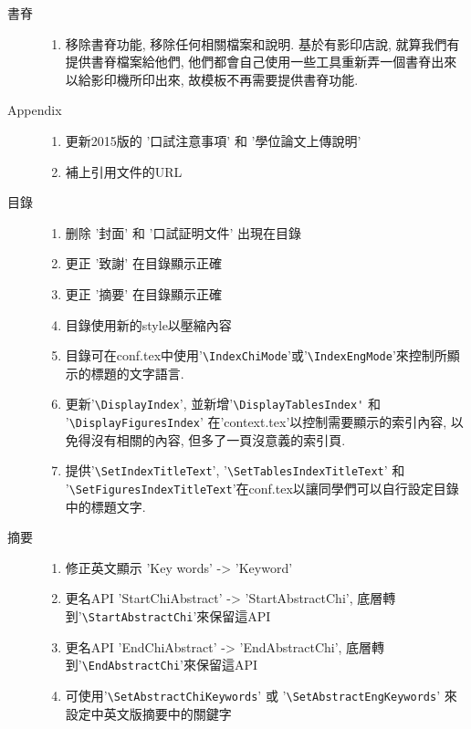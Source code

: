 \begin{description}
\begin{description}
      \item[書脊] \hfill
        \begin{enumerate}
          \item 移除書脊功能, 移除任何相關檔案和說明. 基於有影印店說, 就算我們有提供書脊檔案給他們, 他們都會自己使用一些工具重新弄一個書脊出來以給影印機所印出來, 故模板不再需要提供書脊功能.
        \end{enumerate}
      \item[Appendix] \hfill
        \begin{enumerate}
          \item 更新2015版的 '口試注意事項' 和 '學位論文上傳說明'
          \item 補上引用文件的URL
        \end{enumerate}
      \item[目錄] \hfill
        \begin{enumerate}
          \item 删除 '封面' 和 '口試証明文件' 出現在目錄
          \item 更正 '致謝' 在目錄顯示正確
          \item 更正 '摘要' 在目錄顯示正確
          \item 目錄使用新的style以壓縮內容
          \item 目錄可在conf.tex中使用'\verb|\IndexChiMode|'或'\verb|\IndexEngMode|'來控制所顯示的標題的文字語言.
          \item 更新'\verb|\DisplayIndex|', 並新增'\verb|\DisplayTablesIndex'| 和 '\verb|\DisplayFiguresIndex|' 在'context.tex'以控制需要顯示的索引內容, 以免得沒有相關的內容, 但多了一頁沒意義的索引頁.
          \item 提供'\verb|\SetIndexTitleText|', '\verb|\SetTablesIndexTitleText|' 和 '\verb|\SetFiguresIndexTitleText|'在conf.tex以讓同學們可以自行設定目錄中的標題文字.
        \end{enumerate}
      \item[摘要] \hfill
        \begin{enumerate}
          \item 修正英文顯示 'Key words' -> 'Keyword'
          \item 更名API 'StartChiAbstract' -> 'StartAbstractChi', 底層轉到'\verb|\StartAbstractChi|'來保留這API
          \item 更名API 'EndChiAbstract' -> 'EndAbstractChi', 底層轉到'\verb|\EndAbstractChi|'來保留這API
          \item 可使用'\verb|\SetAbstractChiKeywords|' 或 '\verb|\SetAbstractEngKeywords|' 來設定中英文版摘要中的關鍵字

\end{enumerate}
\end{description}
\end{description}
